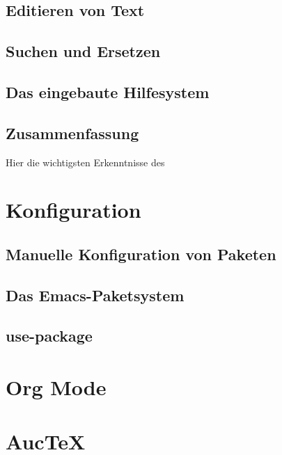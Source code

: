 \documentclass[12pt,ngerman]{scrbook}
\begin{document}
 





\section{Editieren von Text}

\section{Suchen und Ersetzen}

\section{Das eingebaute Hilfesystem}



\section{Zusammenfassung}

Hier die wichtigsten Erkenntnisse des 


\chapter{Konfiguration}


\section{Manuelle Konfiguration von Paketen}

\section{Das Emacs-Paketsystem}

\section{use-package}

\chapter{Org Mode}

\chapter{Auc\TeX}
\end{document}
